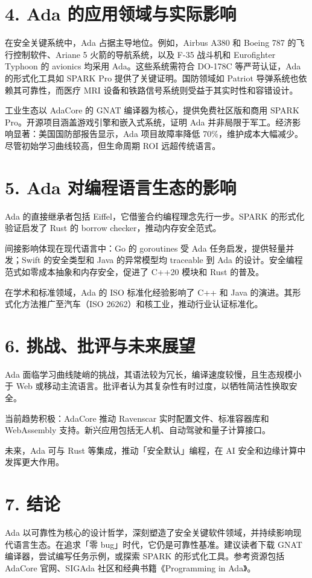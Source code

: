\chapter{4. Ada 的应用领域与实际影响}
在安全关键系统中，Ada 占据主导地位。例如，Airbus A380 和 Boeing 787 的飞行控制软件、Ariane 5 火箭的导航系统，以及 F-35 战斗机和 Eurofighter Typhoon 的 avionics 均采用 Ada。这些系统需符合 DO-178C 等严苛认证，Ada 的形式化工具如 SPARK Pro 提供了关键证明。国防领域如 Patriot 导弹系统也依赖其可靠性，而医疗 MRI 设备和铁路信号系统则受益于其实时性和容错设计。\par
工业生态以 AdaCore 的 GNAT 编译器为核心，提供免费社区版和商用 SPARK Pro。开源项目涵盖游戏引擎和嵌入式系统，证明 Ada 并非局限于军工。经济影响显著：美国国防部报告显示，Ada 项目故障率降低 70\%{}，维护成本大幅减少。尽管初始学习曲线较高，但生命周期 ROI 远超传统语言。\par
\chapter{5. Ada 对编程语言生态的影响}
Ada 的直接继承者包括 Eiffel，它借鉴合约编程理念先行一步。SPARK 的形式化验证启发了 Rust 的 borrow checker，推动内存安全范式。\par
间接影响体现在现代语言中：Go 的 goroutines 受 Ada 任务启发，提供轻量并发；Swift 的安全类型和 Java 的异常模型均 traceable 到 Ada 的设计。安全编程范式如零成本抽象和内存安全，促进了 C++20 模块和 Rust 的普及。\par
在学术和标准领域，Ada 的 ISO 标准化经验影响了 C++ 和 Java 的演进。其形式化方法推广至汽车（ISO 26262）和核工业，推动行业认证标准化。\par
\chapter{6. 挑战、批评与未来展望}
Ada 面临学习曲线陡峭的挑战，其语法较为冗长，编译速度较慢，且生态规模小于 Web 或移动主流语言。批评者认为其复杂性有时过度，以牺牲简洁性换取安全。\par
当前趋势积极：AdaCore 推动 Ravenscar 实时配置文件、标准容器库和 WebAssembly 支持。新兴应用包括无人机、自动驾驶和量子计算接口。\par
未来，Ada 可与 Rust 等集成，推动「安全默认」编程，在 AI 安全和边缘计算中发挥更大作用。\par
\chapter{7. 结论}
Ada 以可靠性为核心的设计哲学，深刻塑造了安全关键软件领域，并持续影响现代语言生态。在追求「零 bug」时代，它仍是可靠性基准。建议读者下载 GNAT 编译器，尝试编写任务示例，或探索 SPARK 的形式化工具。参考资源包括 AdaCore 官网、SIGAda 社区和经典书籍《Programming in Ada》。\par
